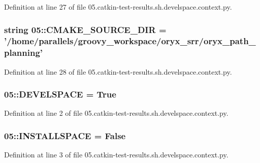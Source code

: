 \-Definition at line 27 of file 05.\-catkin-\/test-\/results.\-sh.\-develspace.\-context.\-py.

\subsubsection[{\-C\-M\-A\-K\-E\-\_\-\-S\-O\-U\-R\-C\-E\-\_\-\-D\-I\-R}]{\setlength{\rightskip}{0pt plus 5cm}string 05\-::{\bf \-C\-M\-A\-K\-E\-\_\-\-S\-O\-U\-R\-C\-E\-\_\-\-D\-I\-R} = '/home/parallels/groovy\-\_\-workspace/oryx\-\_\-srr/oryx\-\_\-path\-\_\-planning'}\label{namespace05_a64a69e49f8bb64d03b726848381e589a}


\-Definition at line 28 of file 05.\-catkin-\/test-\/results.\-sh.\-develspace.\-context.\-py.

\subsubsection[{\-D\-E\-V\-E\-L\-S\-P\-A\-C\-E}]{\setlength{\rightskip}{0pt plus 5cm}05\-::{\bf \-D\-E\-V\-E\-L\-S\-P\-A\-C\-E} = \-True}\label{namespace05_aa1539ccdacdc12c237a7eb245b338dbb}


\-Definition at line 2 of file 05.\-catkin-\/test-\/results.\-sh.\-develspace.\-context.\-py.

\subsubsection[{\-I\-N\-S\-T\-A\-L\-L\-S\-P\-A\-C\-E}]{\setlength{\rightskip}{0pt plus 5cm}05\-::{\bf \-I\-N\-S\-T\-A\-L\-L\-S\-P\-A\-C\-E} = \-False}\label{namespace05_af59f8eaff3efa39540011feb5adfd63b}


\-Definition at line 3 of file 05.\-catkin-\/test-\/results.\-sh.\-develspace.\-context.\-py.

